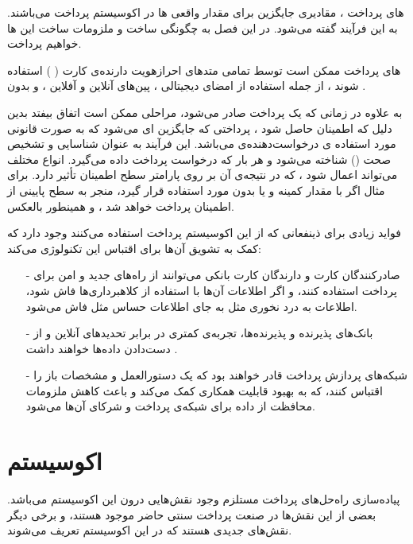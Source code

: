 \documentclass[oneside]{report}
\begin{document}
{\normalsize  {}} های 
پرداخت ، مقادیری جایگزین برای مقدار واقعی 
{\normalsize  {}}ها 
در اکوسیستم پرداخت می‌باشند. به این فرآیند 
{\normalsize {}}
 گفته می‌شود. در این فصل به چگونگی ساخت و ملزومات ساخت این 
{\normalsize  {}}ها
خواهیم پرداخت. 

{\normalsize  {}}های پرداخت
ممکن است توسط تمامی متدهای احرازهویت دارنده‌ی کارت 
(
{\normalsize  {}}
)
استفاده شوند ، از جمله استفاده از امضای دیجیتالی ، پین‌های آنلاین و آفلاین ، و بدون
{\normalsize  {}}.
														
به علاوه در زمانی که یک 
{\normalsize  {}}
پرداخت صادر می‌شود، مراحلی ممکن است اتفاق بیفتد بدین دلیل که اطمینان حاصل شود ، 
{\normalsize  {}}
پرداختی که جایگزین 
{\normalsize  {}} ای 
می‌شود که به صورت قانونی مورد استفاده ی درخواست‌دهنده‌ی 
{\normalsize  {}}
 می‌باشد. این فرآیند به عنوان  شناسایی و تشخیص صحت 
({\normalsize  {}})
شناخته می‌شود و هر بار که درخواست 
{\normalsize  {}}
پرداخت داده می‌گیرد. انواع مختلف 
{\normalsize  {}}
می‌تواند اعمال شود ، که در نتیجه‌ی آن بر روی پارامتر سطح اطمینان 
{\normalsize  {}}
تأثیر دارد. برای مثال اگر با مقدار کمینه و یا بدون 
{\normalsize  {}}
مورد استفاده قرار گیرد، منجر به سطح پایینی از اطمینان 
{\normalsize  {}}
پرداخت خواهد شد ، و همینطور بالعکس. 

فواید زیادی برای ذینفعانی که از این اکوسیستم پرداخت استفاده می‌کنند وجود دارد که کمک به تشویق آن‌ها برای اقتباس این تکنولوژی می‌کند:
\begin{itemize}
	\item[-] 
	صادرکنندگان کارت و دارندگان کارت بانکی می‌توانند از راه‌های جدید و امن برای پرداخت استفاده کنند، و اگر اطلاعات آن‌ها با استفاده از کلاهبرداری‌ها فاش شود، اطلاعات به درد نخوری مثل 
	{\normalsize  {}}
	به جای اطلاعات حساس مثل 
	{\normalsize  {}}
	فاش می‌شود. 
	\item[-]
	بانک‌های پذیرنده و پذیرنده‌ها، تجربه‌ی کمتری در برابر تحدیدهای آنلاین و از دست‌دادن داده‌ها خواهند داشت .
	\item[-] 
	شبکه‌های پردازش پرداخت قادر خواهند بود که یک دستورالعمل و مشخصات باز را اقتباس کنند، که به بهبود قابلیت همکاری کمک می‌کند و باعث کاهش ملزومات محافظت از داده برای شبکه‌ی پرداخت و شرکای آن‌ها می‌شود. 
\end{itemize}

\section{اکوسیستم {\large  {}}}					
پیاده‌سازی راه‌حل‌های 
{\large  {}}
پرداخت مستلزم وجود نقش‌هایی درون این اکوسیستم می‌باشد. بعضی از این نقش‌ها در صنعت پرداخت سنتی حاضر موجود هستند، و برخی دیگر نقش‌های جدیدی هستند که در این اکوسیستم تعریف می‌شوند. 
\end{document}
